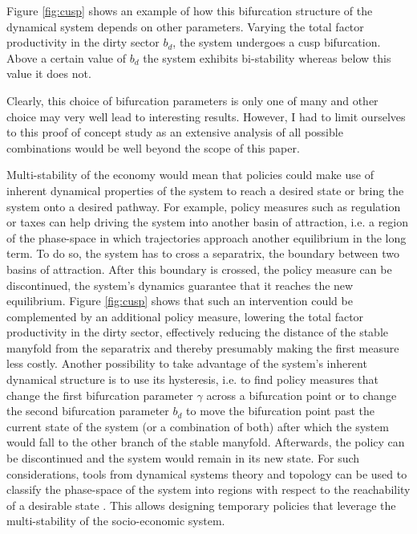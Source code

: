 Figure \ref{fig:cusp} shows an example of how this bifurcation structure of the dynamical system depends on other parameters. Varying the total factor productivity in the dirty sector $b_d$, the system undergoes a cusp bifurcation. Above a certain value of $b_d$ the system exhibits bi-stability whereas below this value it does not.


Clearly, this choice of bifurcation parameters is only one of many and other choice may very well lead to interesting results. However, I had to limit ourselves to this proof of concept study as an extensive analysis of all possible combinations would be well beyond the scope of this paper.


Multi-stability of the economy would mean that policies could make use of inherent dynamical properties of the system to reach a desired state or bring the system onto a desired pathway. For example, policy measures such as regulation or taxes can help driving the system into another basin of attraction, i.e. a region of the phase-space in which trajectories approach another equilibrium in the long term. To do so, the system has to cross a separatrix, the boundary between two basins of attraction.
After this boundary is crossed, the policy measure can be discontinued, the system's dynamics guarantee that it reaches the new equilibrium. 
Figure \ref{fig:cusp} shows that such an intervention could be complemented by an additional policy measure, lowering the total factor productivity in the dirty sector, effectively reducing the distance of the stable manyfold from the separatrix and thereby presumably making the first measure less costly.
Another possibility to take advantage of the system's inherent dynamical structure is to use its hysteresis, i.e. to find policy measures that change the first bifurcation parameter $\gamma$ across a bifurcation point or to change the second bifurcation parameter $b_d$ to move the bifurcation point past the current state of the system (or a combination of both) after which the system would fall to the other branch of the stable manyfold. Afterwards, the policy can be discontinued and the system would remain in its new state.
For such considerations, tools from dynamical systems theory and topology can be used to classify the phase-space of the system into regions with respect to the reachability of a desirable state \citep{Heitzig2016,Nitzbon2017}. This allows designing temporary policies that leverage the multi-stability of the socio-economic system.


